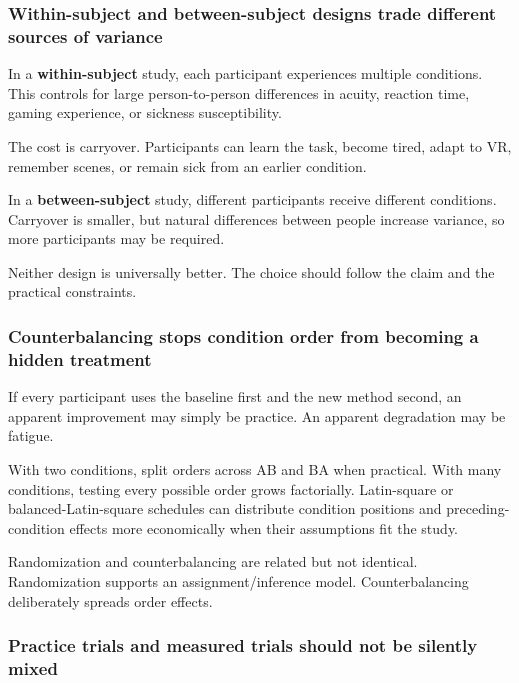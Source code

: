 \subsubsection{Within-subject and between-subject designs trade different sources of variance}\label{within-subject-and-between-subject-designs-trade-different-sources-of-variance}

In a \textbf{within-subject} study, each participant experiences multiple conditions. This controls for large person-to-person differences in acuity, reaction time, gaming experience, or sickness susceptibility.

The cost is carryover. Participants can learn the task, become tired, adapt to VR, remember scenes, or remain sick from an earlier condition.

In a \textbf{between-subject} study, different participants receive different conditions. Carryover is smaller, but natural differences between people increase variance, so more participants may be required.

Neither design is universally better. The choice should follow the claim and the practical constraints.

\subsubsection{Counterbalancing stops condition order from becoming a hidden treatment}\label{counterbalancing-stops-condition-order-from-becoming-a-hidden-treatment}

If every participant uses the baseline first and the new method second, an apparent improvement may simply be practice. An apparent degradation may be fatigue.

With two conditions, split orders across AB and BA when practical. With many conditions, testing every possible order grows factorially. Latin-square or balanced-Latin-square schedules can distribute condition positions and preceding-condition effects more economically when their assumptions fit the study.

Randomization and counterbalancing are related but not identical. Randomization supports an assignment/inference model. Counterbalancing deliberately spreads order effects.

\subsubsection{Practice trials and measured trials should not be silently mixed}\label{practice-trials-and-measured-trials-should-not-be-silently-mixed}

